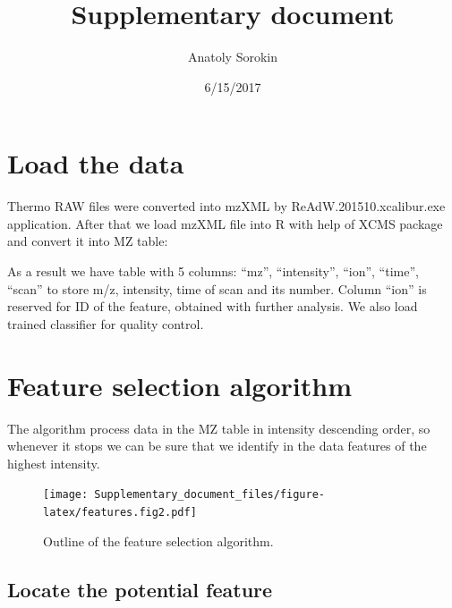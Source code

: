 \documentclass[]{article}
\title{Supplementary document}
\author{Anatoly Sorokin}
\date{6/15/2017}
\newenvironment{Shaded}{\begin{snugshade}}{\end{snugshade}}
\newcommand{\KeywordTok}[1]{\textcolor[rgb]{0.13,0.29,0.53}{\textbf{#1}}}
\newcommand{\StringTok}[1]{\textcolor[rgb]{0.31,0.60,0.02}{#1}}
\newcommand{\OperatorTok}[1]{\textcolor[rgb]{0.81,0.36,0.00}{\textbf{#1}}}
\newcommand{\NormalTok}[1]{#1}
\begin{document}
\maketitle

{
\setcounter{tocdepth}{2}
\tableofcontents
}
\section{Load the data}\label{load-the-data}

Thermo RAW files were converted into mzXML by ReAdW.201510.xcalibur.exe
application. After that we load mzXML file into R with help of XCMS
package and convert it into MZ table:

\begin{Shaded}
\end{Shaded}

As a result we have table with 5 columns: ``mz'', ``intensity'',
``ion'', ``time'', ``scan'' to store m/z, intensity, time of scan and
its number. Column ``ion'' is reserved for ID of the feature, obtained
with further analysis. We also load trained classifier for quality control.

\section{Feature selection algorithm}\label{feature-selection}

The algorithm process data in the MZ table in intensity descending
order, so whenever it stops we can be sure that we identify in the data features of the highest intensity.

\begin{figure}[H]
\begin{center}
\texttt{[image: Supplementary\_document\_files/figure-latex/features.fig2.pdf]}
\caption{Outline of the feature selection algorithm.}
\label{fig:alg}
\end{center}
\end{figure}


\subsection{Locate the potential feature}
\end{document}

